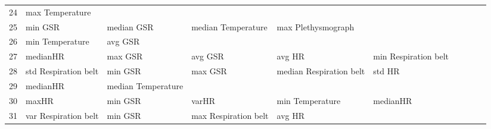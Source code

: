\begin{landscape}
\begin{table}[]
\begin{tabular}{l|llllllll}
24       & max Temperature         &                         &                         &                         &                         &                       &                         &                         &                         &         \\
25       & min GSR                 & median GSR              & median Temperature      & max Plethysmograph      &                         &                       &                         &                         &                         &         \\
26       & min Temperature         & avg GSR                 &                         &                         &                         &                       &                         &                         &                         &         \\
27       & medianHR                & max GSR                 & avg GSR                 & avg HR                  & min Respiration belt    &                       &                         &                         &                         &         \\
28       & std Respiration belt    & min GSR                 & max GSR                 & median Respiration belt & std HR                  &                       &                         &                         &                         &         \\
29       & medianHR                & median Temperature      &                         &                         &                         &                       &                         &                         &                         &         \\
30       & maxHR                   & min GSR                 & varHR                   & min Temperature         & medianHR                &                       &                         &                         &                         &         \\
31       & var Respiration belt    & min GSR                 & max Respiration belt    & avg HR                  &                         &                       &                         &                         &                         &         \\
\end{tabular}
\end{table}
\end{landscape}
\clearpage
